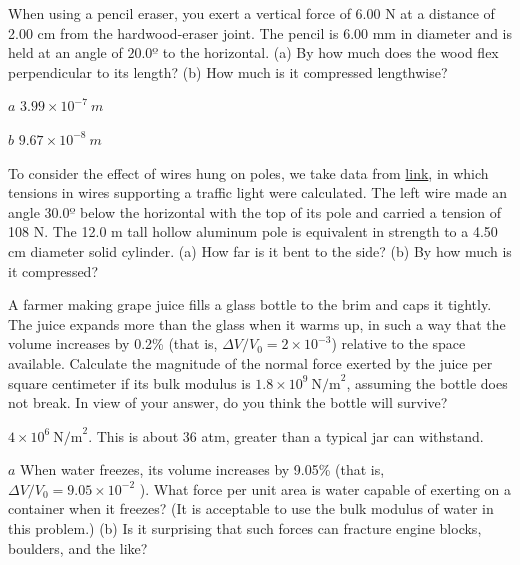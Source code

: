 \documentclass[
]{book}
\newenvironment{problems-exercises}{}{}
\begin{document}
\begin{problems-exercises}
\hypertarget{fs-id1165296255735}{}
\leavevmode\hypertarget{fs-id1165296255736}{}%
When using a pencil eraser, you exert a vertical force of 6.00 N at a
distance of 2.00 cm from the hardwood-eraser joint. The pencil is 6.00
mm in diameter and is held at an angle of \(\text{20.0º}\) to the
horizontal. (a) By how much does the wood flex perpendicular to its
length? (b) How much is it compressed lengthwise?

\leavevmode\hypertarget{fs-id1165298654339}{}%
\(a\) \({3\text{.}{\text{99} \times \text{10}^{- 7}}\ m}{}\)

\(b\) \({9\text{.}{\text{67} \times \text{10}^{- 8}}\ m}{}\)

\hypertarget{fs-id1165298783085}{}
\leavevmode\hypertarget{fs-id1165298783086}{}%
To consider the effect of wires hung on poles, we take data from
\href{/m54876\#fs-id1348788}{link}, in which tensions
in wires supporting a traffic light were calculated. The left wire made
an angle \(\text{30.0º}\) below the horizontal with the top of its pole
and carried a tension of 108 N. The 12.0 m tall hollow aluminum pole is
equivalent in strength to a 4.50 cm diameter solid cylinder. (a) How far
is it bent to the side? (b) By how much is it compressed?

\hypertarget{fs-id1165298713046}{}
\leavevmode\hypertarget{fs-id1165298713047}{}%
A farmer making grape juice fills a glass bottle to the brim and caps it
tightly. The juice expands more than the glass when it warms up, in such
a way that the volume increases by 0.2\% (that is,
\({{\Delta V/V_{0}} = {2 \times \text{10}^{- 3}}}{}\)) relative to the
space available. Calculate the magnitude of the normal force exerted by
the juice per square centimeter if its bulk modulus is
\({1\text{.}{8 \times \text{10}^{9}}\ \text{N/m}^{2}}{}\), assuming the
bottle does not break. In view of your answer, do you think the bottle
will survive?

\leavevmode\hypertarget{fs-id1165298481228}{}%
\({{4 \times \text{10}^{6}}\ \text{N/m}^{2}}{}\). This is about 36 atm,
greater than a typical jar can withstand.

\hypertarget{fs-id1165298913397}{}
\leavevmode\hypertarget{fs-id1165298913398}{}%
\(a\) When water freezes, its volume increases by 9.05\% (that is,
\({{\Delta V/V_{0}} = 9}\text{.}{\text{05} \times \text{10}^{- 2}}\) ).
What force per unit area is water capable of exerting on a container
when it freezes? (It is acceptable to use the bulk modulus of water in
this problem.) (b) Is it surprising that such forces can fracture engine
blocks, boulders, and the like?


\end{problems-exercises}
\end{document}
